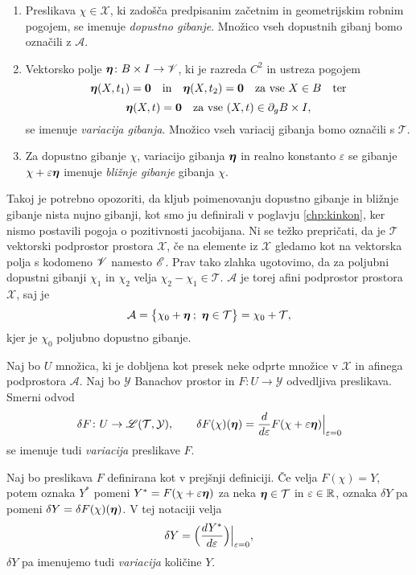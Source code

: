 \begin{definicija}
	\begin{enumerate}
		\item Preslikava $\chi\in\mathcal{X}$, ki zadošča predpisanim začetnim in geometrijskim robnim pogojem,
			se imenuje \emph{dopustno gibanje}. Množico vseh dopustnih gibanj bomo označili z $\mathcal{A}$.
		\item Vektorsko polje $\boldsymbol \eta\colon B\times I\to\mathscr V$, ki je razreda $C^2$ in
			ustreza pogojem
			\[ \boldsymbol \eta(X,t_1)=\boldsymbol 0\quad \textrm{in} \quad\boldsymbol \eta(X,t_2)=\boldsymbol 0\quad \textrm{za vse}\ X\in B\quad\textrm{ter} \]
			\[ \vek{\eta}(X,t)=\vek{0}\quad \textrm{za vse}\ (X,t)\in \partial_g B\times I, \]
			se imenuje \emph{variacija gibanja}. Množico vseh variacij gibanja bomo ozna\-čili s $\mathcal{T}$.
		\item Za dopustno gibanje $\chi$, variacijo gibanja $\boldsymbol \eta$ in realno konstanto $\varepsilon$ se gibanje
			$\chi+\varepsilon\boldsymbol \eta$ imenuje \emph{bližnje gibanje} gibanja $\chi$.
	\end{enumerate}
\end{definicija}

Takoj je potrebno opozoriti, da kljub poimenovanju dopustno gibanje in bližnje gibanje nista nujno gibanji,
kot smo ju definirali v poglavju \ref{chp:kinkon}, ker nismo postavili pogoja o pozitivnosti jacobijana.
Ni se težko prepričati, da je $\mathcal{T}$ vektorski podprostor prostora $\mathcal{X}$, če na elemente iz $\mathcal{X}$
gledamo kot na vektorska polja s kodomeno $\mathscr V$ namesto $\mathscr E$.
Prav tako zlahka ugotovimo, da za poljubni dopustni gibanji $\chi_1$ in $\chi_2$
velja $\chi_2-\chi_1\in\mathcal{T}$. $\mathcal{A}$ je torej afini podprostor prostora $\mathcal{X}$, saj je
\[ \mathcal{A}=\big\{ \chi_0+\boldsymbol \eta\: ;\ \boldsymbol \eta\in\mathcal{T} \big\}=\chi_0+\mathcal{T}, \]
kjer je $\chi_0$ poljubno dopustno gibanje.

\begin{definicija}
	Naj bo $U$ množica, ki je dobljena kot presek neke odprte množice v $\mathcal{X}$ in afinega
	podprostora $\mathcal{A}$. Naj bo $\mathcal{Y}$ Banachov prostor in $F\colon U\to\mathcal{Y}$
	odvedljiva preslikava. Smerni odvod
	\[
		\delta F\colon U\to\mathscr L(\mathcal{T},\mathcal{Y}),\qquad
		\delta F(\chi)(\boldsymbol \eta)=\frac{d}{d\varepsilon}F(\chi+\varepsilon\boldsymbol \eta)\Big|_{\varepsilon=0}
	\]
	se imenuje tudi \emph{variacija} preslikave $F$.
\end{definicija}

\begin{notacija}
	Naj bo preslikava $F$ definirana kot v prejšnji definiciji. Če velja $F(\chi)=Y$,
	potem oznaka $Y^*$ pomeni $Y^*=F(\chi+\varepsilon\boldsymbol \eta)$ za neka $\boldsymbol \eta\in\mathcal{T}$ in $\varepsilon\in\mathbb R$,
	oznaka $\delta Y$ pa pomeni $\delta Y=\delta F(\chi)(\boldsymbol \eta)$. V tej notaciji velja
	\[ \delta Y = \Big(\frac{dY^*}{d\varepsilon}\Big)\Big|_{\varepsilon=0}, \]
	$\delta Y$ pa imenujemo tudi \emph{variacija} količine $Y$.
\end{notacija}

